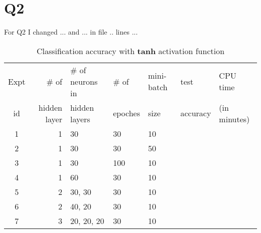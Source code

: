 \documentclass[11pt]{article}
\begin{document}
\section{Q2}
For Q2 I changed ... and ... in file .. lines ...
\begin{table}[h]
\centering
\caption{Classification accuracy with {\bf tanh} activation function}
\label{table1}
  \begin{tabular}{|c|r|l|l|l|l|l|} \hline
    Expt & \# of          & \# of neurons in & \# of    & mini-batch & test  & CPU time   \\  
    id   &  hidden layer  & hidden layers    & epoches & size       & accuracy  & (in minutes) \\ \hline

    1   &  1              &  30              &  30     &  10       &     & \\ \hline
    2   &  1              &  30              &  30     &  50       &     & \\ \hline
    3   &  1              &  30              &  100    &  10       &     &  \\ \hline
    4   &  1              &  60              &  30     &  10       &     & \\ \hline
    5   &  2              &  30, 30          &  30     &  10       &     & \\ \hline

    6   &  2              &  40, 20          &  30     &  10       &     & \\ \hline
    
    7   &  3              &  20, 20, 20      &  30     &  10       &     & \\ \hline
  \end{tabular}
\end{table}
\end{document}

